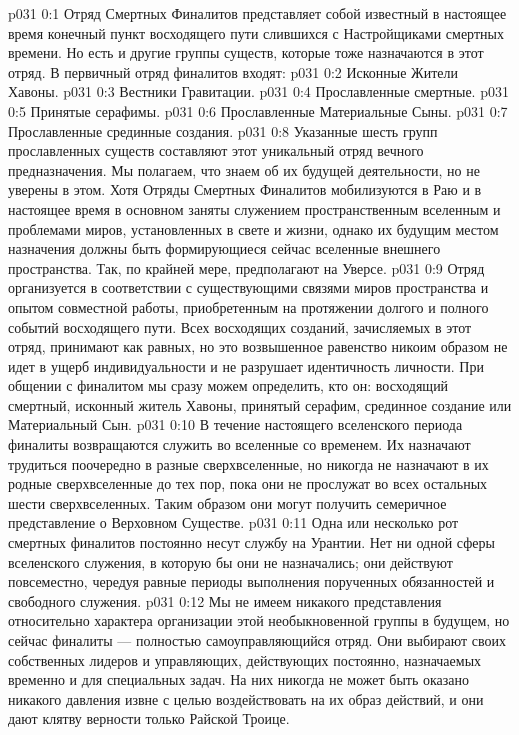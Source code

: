 \author{Божественный Советник и Не Имеющий Имени и Номера}
\vs p031 0:1 Отряд Смертных Финалитов представляет собой известный в настоящее время конечный пункт восходящего пути слившихся с Настройщиками смертных времени. Но есть и другие группы существ, которые тоже назначаются в этот отряд. В первичный отряд финалитов входят:
\vs p031 0:2 \bibnobreakspace Исконные Жители Хавоны.
\vs p031 0:3 \bibnobreakspace Вестники Гравитации.
\vs p031 0:4 \bibnobreakspace Прославленные смертные.
\vs p031 0:5 \bibnobreakspace Принятые серафимы.
\vs p031 0:6 \bibnobreakspace Прославленные Материальные Сыны.
\vs p031 0:7 \bibnobreakspace Прославленные срединные создания.
\vs p031 0:8 \pc Указанные шесть групп прославленных существ составляют этот уникальный отряд вечного предназначения. Мы полагаем, что знаем об их будущей деятельности, но не уверены в этом. Хотя Отряды Смертных Финалитов мобилизуются в Раю и в настоящее время в основном заняты служением пространственным вселенным и проблемами миров, установленных в свете и жизни, однако их будущим местом назначения должны быть формирующиеся сейчас вселенные внешнего пространства. Так, по крайней мере, предполагают на Уверсе.
\vs p031 0:9 Отряд организуется в соответствии с существующими связями миров пространства и опытом совместной работы, приобретенным на протяжении долгого и полного событий восходящего пути. Всех восходящих созданий, зачисляемых в этот отряд, принимают как равных, но это возвышенное равенство никоим образом не идет в ущерб индивидуальности и не разрушает идентичность личности. При общении с финалитом мы сразу можем определить, кто он: восходящий смертный, исконный житель Хавоны, принятый серафим, срединное создание или Материальный Сын.
\vs p031 0:10 В течение настоящего вселенского периода финалиты возвращаются служить во вселенные со временем. Их назначают трудиться поочередно в разные сверхвселенные, но никогда не назначают в их родные сверхвселенные до тех пор, пока они не прослужат во всех остальных шести сверхвселенных. Таким образом они могут получить семеричное представление о Верховном Существе.
\vs p031 0:11 Одна или несколько рот смертных финалитов постоянно несут службу на Урантии. Нет ни одной сферы вселенского служения, в которую бы они не назначались; они действуют повсеместно, чередуя равные периоды выполнения порученных обязанностей и свободного служения.
\vs p031 0:12 Мы не имеем никакого представления относительно характера организации этой необыкновенной группы в будущем, но сейчас финалиты --- полностью самоуправляющийся отряд. Они выбирают своих собственных лидеров и управляющих, действующих постоянно, назначаемых временно и для специальных задач. На них никогда не может быть оказано никакого давления извне с целью воздействовать на их образ действий, и они дают клятву верности только Райской Троице.
